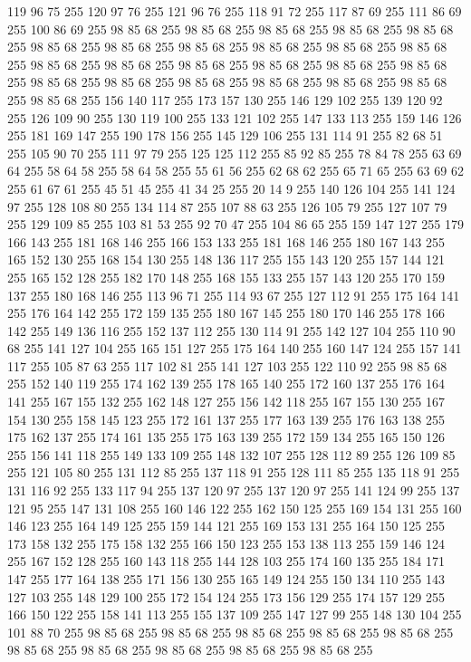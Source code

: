 119 96 75 255 120 97 76 255 121 96 76 255 118 91 72 255 117 87 69 255 111 86 69 255 100 86 69 255 98 85 68 255 98 85 68 255 98 85 68 255 98 85 68 255 98 85 68 255 98 85 68 255 98 85 68 255 98 85 68 255 98 85 68 255 98 85 68 255 98 85 68 255 98 85 68 255 98 85 68 255 98 85 68 255 98 85 68 255 98 85 68 255 98 85 68 255 98 85 68 255 98 85 68 255 98 85 68 255 98 85 68 255 98 85 68 255 98 85 68 255 98 85 68 255 156 140 117 255 173 157 130 255 146 129 102 255 139 120 92 255 126 109 90 255 130 119 100 255 133 121 102 255 147 133 113 255 159 146 126 255 181 169 147 255 190 178 156 255 145 129 106 255 131 114 91 255 82 68 51 255 105 90 70 255 111 97 79 255 125 125 112 255 85 92 85 255 78 84 78 255 63 69 64 255 58 64 58 255 58 64 58 255 55 61 56 255 62 68 62 255 65 71 65 255 63 69 62 255 61 67 61 255 45 51 45 255 41 34 25 255 20 14 9 255 140 126 104 255 141 124 97 255 128 108 80 255
134 114 87 255 107 88 63 255 126 105 79 255 127 107 79 255 129 109 85 255 103 81 53 255 92 70 47 255 104 86 65 255 159 147 127 255 179 166 143 255 181 168 146 255 166 153 133 255 181 168 146 255 180 167 143 255 165 152 130 255 168 154 130 255 148 136 117 255 155 143 120 255 157 144 121 255 165 152 128 255 182 170 148 255 168 155 133 255 157 143 120 255 170 159 137 255 180 168 146 255 113 96 71 255 114 93 67 255 127 112 91 255 175 164 141 255 176 164 142 255 172 159 135 255 180 167 145 255 180 170 146 255 178 166 142 255 149 136 116 255 152 137 112 255 130 114 91 255 142 127 104 255 110 90 68 255 141 127 104 255 165 151 127 255 175 164 140 255 160 147 124 255 157 141 117 255 105 87 63 255 117 102 81 255 141 127 103 255 122 110 92 255 98 85 68 255 152 140 119 255 174 162 139 255 178 165 140 255 172 160 137 255 176 164 141 255 167 155 132 255 162 148 127 255 156 142 118 255 167 155 130 255 167 154 130 255 158 145 123 255 172 161 137 255 177 163 139 255 176 163 138 255 175 162 137 255
174 161 135 255 175 163 139 255 172 159 134 255 165 150 126 255 156 141 118 255 149 133 109 255 148 132 107 255 128 112 89 255 126 109 85 255 121 105 80 255 131 112 85 255 137 118 91 255 128 111 85 255 135 118 91 255 131 116 92 255 133 117 94 255 137 120 97 255 137 120 97 255 141 124 99 255 137 121 95 255 147 131 108 255 160 146 122 255 162 150 125 255 169 154 131 255 160 146 123 255 164 149 125 255 159 144 121 255 169 153 131 255 164 150 125 255 173 158 132 255 175 158 132 255 166 150 123 255 153 138 113 255 159 146 124 255 167 152 128 255 160 143 118 255 144 128 103 255 174 160 135 255 184 171 147 255 177 164 138 255 171 156 130 255 165 149 124 255 150 134 110 255 143 127 103 255 148 129 100 255 172 154 124 255 173 156 129 255 174 157 129 255 166 150 122 255 158 141 113 255 155 137 109 255 147 127 99 255 148 130 104 255 101 88 70 255 98 85 68 255 98 85 68 255 98 85 68 255 98 85 68 255 98 85 68 255 98 85 68 255 98 85 68 255 98 85 68 255 98 85 68 255 98 85 68 255

